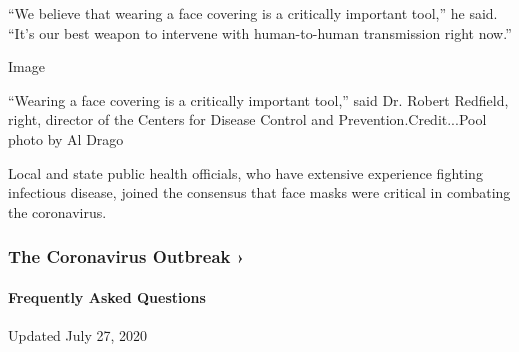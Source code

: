 ``We believe that wearing a face covering is a critically important
tool,'' he said. ``It's our best weapon to intervene with human-to-human
transmission right now.''

Image

``Wearing a face covering is a critically important tool,'' said Dr.
Robert Redfield, right, director of the Centers for Disease Control and
Prevention.Credit...Pool photo by Al Drago

Local and state public health officials, who have extensive experience
fighting infectious disease, joined the consensus that face masks were
critical in combating the coronavirus.

\href{https://www.nytimes.com/news-event/coronavirus?action=click\&pgtype=Article\&state=default\&region=MAIN_CONTENT_3\&context=storylines_faq}{}

\hypertarget{the-coronavirus-outbreak-}{%
\subsubsection{The Coronavirus Outbreak
›}\label{the-coronavirus-outbreak-}}

\hypertarget{frequently-asked-questions}{%
\paragraph{Frequently Asked
Questions}\label{frequently-asked-questions}}

Updated July 27, 2020

